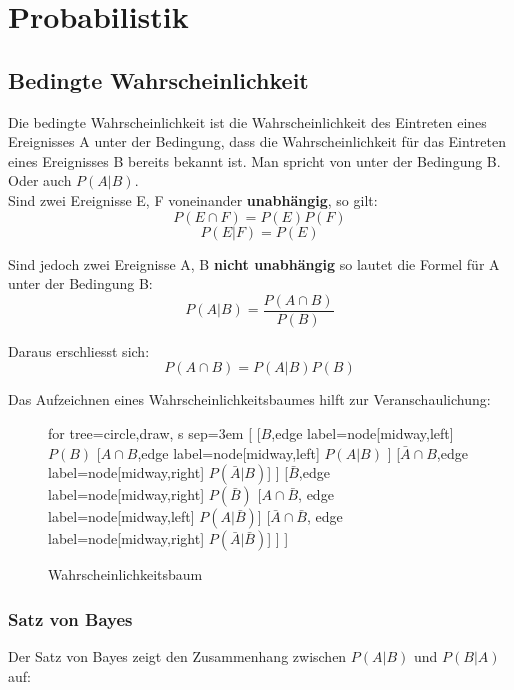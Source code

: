 
\newpage
\section{Probabilistik}
\subsection{Bedingte Wahrscheinlichkeit}

Die bedingte Wahrscheinlichkeit ist die Wahrscheinlichkeit des Eintreten eines Ereignisses A unter der Bedingung, dass die Wahrscheinlichkeit für das Eintreten eines Ereignisses B bereits bekannt ist. Man spricht von  unter der Bedingung B\dq. Oder auch $P(A|B)$.\\


Sind zwei Ereignisse E, F voneinander \textbf{unabhängig}, so gilt:
$$ P(E \cap F) = P(E)P(F) $$
$$ P(E|F) = P(E)$$

Sind jedoch zwei Ereignisse A, B \textbf{nicht unabhängig} so lautet die Formel für A unter der Bedingung B:
	$$P(A|B) = \frac{P(A \cap B)}{P(B)}$$


Daraus erschliesst sich:
	$$P(A \cap B) = P(A|B)P(B)$$


Das Aufzeichnen eines Wahrscheinlichkeitsbaumes hilft zur Veranschaulichung: \\

\begin{figure}[H]
	\centering
	\label{fig:probability_tree}
	\begin{forest}
	for tree={circle,draw, s sep=3em}
	[ 
	    [$B$,edge label={node[midway,left] {$P(B)$}}
	      [$A \cap B$,edge label={node[midway,left] {$P(A|B)$}} ] 
	      [$\bar{A} \cap B$,edge label={node[midway,right] {$P(\bar{A}|B)$}}] 
	    ]
	    [$\bar{B}$,edge label={node[midway,right] {$P(\bar{B})$}}
	      [$A \cap \bar{B}$, edge label={node[midway,left] {$P(A|\bar{B})$}}] 
	      [$\bar{A} \cap \bar{B}$, edge label={node[midway,right] {$P(\bar{A}| \bar{B})$}}] 
	  ] 
	]
	\end{forest}
	\caption{Wahrscheinlichkeitsbaum}
\end{figure}

\subsubsection{Satz von Bayes}

Der Satz von Bayes zeigt den Zusammenhang zwischen $P(A|B)$ und $P(B|A)$ auf:

